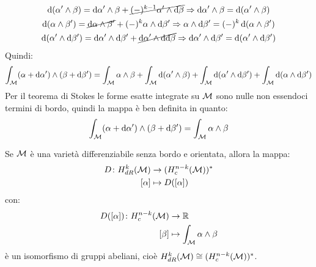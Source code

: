\begin{gather*}
  \d (\alpha' \wedge \beta) = \d \alpha' \wedge \beta + \cancel{(-)^{k-1} \alpha' \wedge \d \beta} \Rightarrow  \d \alpha' \wedge \beta = \d (\alpha' \wedge \beta) \\
  \d (\alpha \wedge \beta') = \cancel{\d \alpha \wedge \beta'} + (-)^{k} \alpha \wedge \d \beta' \Rightarrow  \alpha \wedge \d \beta' = (-)^k  \d (\alpha \wedge \beta') \\
  \d (\alpha' \wedge \d \beta') = \d \alpha' \wedge \d \beta' + \cancel{\d \alpha' \wedge \d {\d \beta}} \Rightarrow \d \alpha' \wedge \d \beta' =  \d (\alpha' \wedge \d \beta')
\end{gather*}
Quindi:
\[
  \int_{\mathcal{M}} (\alpha + \operatorname{d}\!{\alpha}') \wedge (\beta + \operatorname{d}\!{\beta}') = \int_{\mathcal{M}} \alpha \wedge \beta + \int_{\mathcal{M}} \operatorname{d}\!{(\alpha' \wedge \beta)} + \int_{\mathcal{M}} \operatorname{d}\!{(\alpha' \wedge \operatorname{d}\!{\beta}')} + \int_{\mathcal{M}} \operatorname{d}\!{(\alpha \wedge \operatorname{d}\!{\beta}')}
\]
Per il teorema di Stokes le forme esatte integrate su $ \mathcal{M} $ sono nulle non
essendoci termini di bordo, quindi la mappa è ben definita in quanto:
\[
  \int_{\mathcal{M}} (\alpha + \operatorname{d}\!{\alpha}') \wedge (\beta + \operatorname{d}\!{\beta}') = \int_{\mathcal{M}} \alpha \wedge \beta
\]
\begin{theorem}
  Se $ \mathcal{M} $ è una varietà differenziabile senza bordo e orientata, allora la
  mappa:
  \begin{align*}
    D \colon H^k_{dR}(\mathcal{M}) & \to (H_c^{n-k}(\mathcal{M}))^* \\
    [\alpha] & \mapsto D([\alpha])
  \end{align*}
  con:
  \begin{align*}
    D([\alpha]) \colon H^{n-k}_c(\mathcal{M}) & \to \mathbb{R}^{} \\
    [\beta] & \mapsto \int_{\mathcal{M}} \alpha \wedge \beta
  \end{align*}
  è un isomorfismo di gruppi abeliani, cioè $ H^k_{dR}(\mathcal{M}) \cong (H^{n-k}_c(\mathcal{M}))^* $.
\end{theorem}

